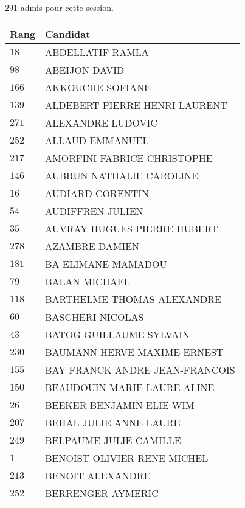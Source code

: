 




  $291$ admis pour cette session.

  \begin{xltabular}{\linewidth}{|l|X|}
    \hline
    \textbf{Rang} & \textbf{Candidat} \\
    \hline
    $18$ & ABDELLATIF RAMLA \\
    \hline
    $98$ & ABEIJON DAVID \\
    \hline
    $166$ & AKKOUCHE SOFIANE \\
    \hline
    $139$ & ALDEBERT PIERRE HENRI LAURENT \\
    \hline
    $271$ & ALEXANDRE LUDOVIC \\
    \hline
    $252$ & ALLAUD EMMANUEL \\
    \hline
    $217$ & AMORFINI FABRICE CHRISTOPHE \\
    \hline
    $146$ & AUBRUN NATHALIE CAROLINE \\
    \hline
    $16$ & AUDIARD CORENTIN \\
    \hline
    $54$ & AUDIFFREN JULIEN \\
    \hline
    $35$ & AUVRAY HUGUES PIERRE HUBERT \\
    \hline
    $278$ & AZAMBRE DAMIEN \\
    \hline
    $181$ & BA ELIMANE MAMADOU \\
    \hline
    $79$ & BALAN MICHAEL \\
    \hline
    $118$ & BARTHELME THOMAS ALEXANDRE \\
    \hline
    $60$ & BASCHERI NICOLAS \\
    \hline
    $43$ & BATOG GUILLAUME SYLVAIN \\
    \hline
    $230$ & BAUMANN HERVE MAXIME ERNEST \\
    \hline
    $155$ & BAY FRANCK ANDRE JEAN-FRANCOIS \\
    \hline
    $150$ & BEAUDOUIN MARIE LAURE ALINE \\
    \hline
    $26$ & BEEKER BENJAMIN ELIE WIM \\
    \hline
    $207$ & BEHAL JULIE ANNE LAURE \\
    \hline
    $249$ & BELPAUME JULIE CAMILLE \\
    \hline
    $1$ & BENOIST OLIVIER RENE MICHEL \\
    \hline
    $213$ & BENOIT ALEXANDRE \\
    \hline
    $252$ & BERRENGER AYMERIC \\

\end{xltabular}
